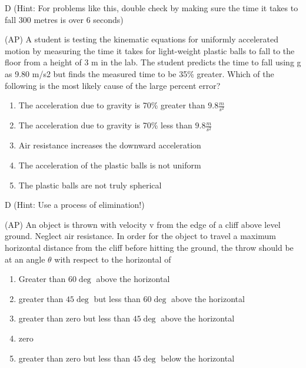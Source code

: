 \begin{solution}
D (Hint: For problems like this, double check by making sure the time it takes to fall 300 metres is over 6 seconds)
\end{solution}

\newpage
\begin{question}
(AP) A student is testing the kinematic equations for uniformly accelerated motion by measuring the time it takes for light-weight plastic balls to fall to the floor from a height of 3 m in the lab. The student predicts the time to fall using g as 9.80 m/s2 but finds the measured time to be 35\% greater. Which of the following is the most likely cause of the large percent error?   

\begin{enumerate}[label=(\alph*)]
    \item The acceleration due to gravity is 70\% greater than $9.8\frac{m}{s^2}$
    \item The acceleration due to gravity is 70\% less than $9.8\frac{m}{s^2}$
    \item Air resistance increases the downward acceleration
    \item The acceleration of the plastic balls is not uniform
    \item The plastic balls are not truly spherical
\end{enumerate}

\end{question}

\begin{solution}
D (Hint: Use a process of elimination!)
\end{solution}


\begin{question}
(AP) An object is thrown with velocity v from the edge of a cliff above level ground. Neglect air resistance. In order for the object to travel a maximum horizontal distance from the cliff before hitting the ground, the throw should be at an angle $\theta$ with respect to the horizontal of

\begin{enumerate}[label=(\alph*)]
    \item Greater than $60\deg$ above the horizontal
    \item greater than $45\deg$ but less than $60\deg$ above the horizontal
    \item greater than zero but less than $45\deg$ above the horizontal
    \item zero
    \item greater than zero but less than $45\deg$ below the horizontal
\end{enumerate}

\end{question}

